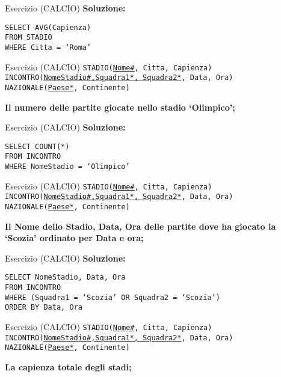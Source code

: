 \begin{frame}{Esercizio (CALCIO)}
    \textbf{Soluzione:}
    \vspace{1em}
    
    \texttt{SELECT AVG(Capienza)\\FROM STADIO\\WHERE Citta = `Roma'}
\end{frame}
\begin{frame}{Esercizio (CALCIO) } 
    \texttt{STADIO(\underline{Nome\#}, Citta, Capienza)\\
    INCONTRO(\underline{NomeStadio\#,Squadra1*, Squadra2*}, Data, Ora)\\
    NAZIONALE(\underline{Paese*}, Continente)}
    \vspace{1em}
    
    \textbf{Il numero delle partite giocate nello stadio `Olimpico';}
\end{frame}

\begin{frame}{Esercizio (CALCIO)}
    \textbf{Soluzione:}
    \vspace{1em}
    
    \texttt{SELECT COUNT(*)\\FROM INCONTRO\\WHERE NomeStadio = `Olimpico'}
\end{frame}
\begin{frame}{Esercizio (CALCIO) } 
    \texttt{STADIO(\underline{Nome\#}, Citta, Capienza)\\
    INCONTRO(\underline{NomeStadio\#,Squadra1*, Squadra2*}, Data, Ora)\\
    NAZIONALE(\underline{Paese*}, Continente)}
    \vspace{1em}
    
    \textbf{Il Nome dello Stadio, Data, Ora delle partite dove ha giocato la `Scozia' ordinato per Data e ora;}
\end{frame}

\begin{frame}{Esercizio (CALCIO)}
    \textbf{Soluzione:}
    \vspace{1em}
    
    \texttt{SELECT NomeStadio, Data, Ora\\FROM INCONTRO\\WHERE (Squadra1 = `Scozia' OR Squadra2 = `Scozia') \\ORDER BY Data, Ora}
\end{frame}
\begin{frame}{Esercizio (CALCIO) } 
    \texttt{STADIO(\underline{Nome\#}, Citta, Capienza)\\
    INCONTRO(\underline{NomeStadio\#,Squadra1*, Squadra2*}, Data, Ora)\\
    NAZIONALE(\underline{Paese*}, Continente)}
    \vspace{1em}
    
    \textbf{La capienza totale degli stadi;}
\end{frame}

